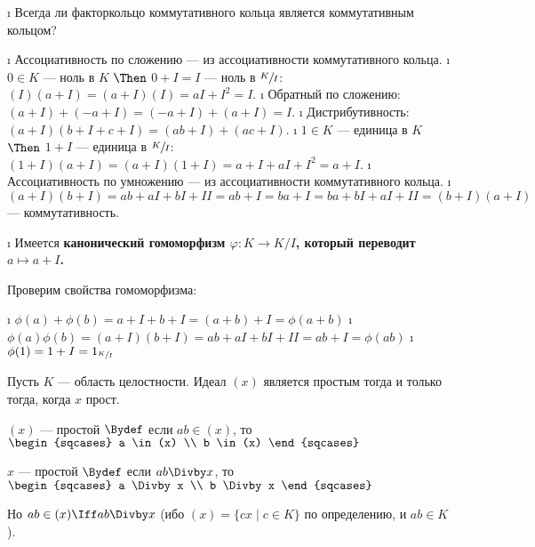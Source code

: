 \begin{enumerate}[label=\asbuk{enumi})]
\tightlist
\i
  Всегда ли факторкольцо коммутативного кольца является коммутативным кольцом?
  \begin{solution}

  \begin{itemize}
  \tightlist
  \i
    Ассоциативность по сложению --- из ассоциативности коммутативного кольца.
  \i
    \(0 \in K\) --- ноль в \(K\) \(\Then\) \(0+I=I\) --- ноль в \(\sfrac{K}{I}\): \((I)(a+I) = (a+I)(I) = aI+I^2 = I\).
  \i
    Обратный по сложению: \((a+I)+(-a+I) = (-a+I)+(a+I) = I\).
  \i
    Дистрибутивность: \((a+I)(b+I+c+I) = (ab+I)+(ac+I)\).
  \i
    \(1 \in K\) --- единица в \(K\) \(\Then\) \(1+I\) --- единица в \(\sfrac{K}{I}\): \((1+I)(a+I) = (a+I)(1+I) = a+I+aI+I^2 = a+I\).
  \i
    Ассоциативность по умножению --- из ассоциативности коммутативного кольца.
  \i
    \((a+I)(b+I) = ab+aI+bI+II=ab+I=ba+I=ba+bI+aI+II=(b+I)(a+I)\) --- коммутативность.
  \end{itemize}

  \end{solution}
\i
  Имеется \bf{канонический} гомоморфизм \(\varphi: K \to K/I\), который переводит \(a \mapsto a+I\).
  \begin{solution}
  Проверим свойства гомоморфизма:

  \begin{itemize}
  \tightlist
  \i
    \(\phi(a)+\phi(b)=a+I+b+I= (a+b)+I=\phi(a+b)\)
  \i
    \(\phi(a)\phi(b) = (a+I)(b+I) = ab+aI+bI+II = ab+I = \phi(ab)\)
  \i
    \(\phi(1) = 1+I = 1_{\sfrac{K}{I}}\)
  \end{itemize}

  \end{solution}
\end{enumerate}

\begin{problem}[20(4.5)]
Пусть $K$ --- область целостности. Идеал $(x)$ является простым тогда и только тогда, когда $x$ прост.
\end{problem}
\begin{solution}
\((x)\) --- простой \(\Bydef\) если \(ab \in (x)\), то \(\begin{sqcases} a \in (x) \\ b \in (x) \end{sqcases}\)

\(x\) --- простой \(\Bydef\) если \(ab \Divby x\), то \(\begin{sqcases} a \Divby x \\ b \Divby x \end{sqcases}\)

Но \(ab \in (x) \Iff ab \Divby x\) (ибо \((x) = \{cx \mid c \in K\}\) по определению, и \(ab \in K\)).
\end{solution}

